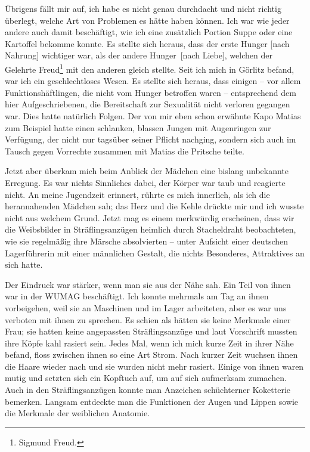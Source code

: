 Übrigens fällt mir auf, ich habe es nicht genau durchdacht und nicht richtig überlegt, welche Art von Problemen es hätte haben können. Ich war wie jeder andere auch damit beschäftigt, wie ich eine zusätzlich Portion Suppe oder eine Kartoffel bekomme konnte. Es stellte sich heraus, dass der erste Hunger [nach Nahrung] wichtiger war, als der andere \glqq Hunger\grqq~[nach Liebe], welchen der Gelehrte Freud\footnote{Sigmund Freud.} mit den anderen gleich stellte. Seit ich mich in Görlitz befand, war ich ein geschlechtloses Wesen. Es stellte sich heraus, dass einigen -- vor allem Funktionshäftlingen, die nicht vom Hunger betroffen waren -- entsprechend dem hier Aufgeschriebenen, die Bereitschaft zur Sexualität nicht verloren gegangen war. Dies hatte natürlich Folgen. Der von mir eben schon erwähnte Kapo Matias zum Beispiel hatte einen schlanken, blassen Jungen mit Augenringen zur Verfügung, der nicht nur tagsüber seiner Pflicht nachging, sondern sich auch im Tausch gegen Vorrechte zusammen mit Matias die Pritsche teilte.

Jetzt aber überkam mich beim Anblick der Mädchen eine bislang unbekannte Erregung. Es war nichts Sinnliches dabei, der Körper war taub und reagierte nicht. An meine Jugendzeit erinnert, rührte es mich innerlich, als ich die herannahenden Mädchen sah; das Herz und die Kehle drückte mir und ich wusste nicht aus welchem Grund. Jetzt mag es einem merkwürdig erscheinen, dass wir die Weibsbilder in Sträflingsanzügen heimlich durch Stacheldraht beobachteten, wie sie regelmäßig ihre Märsche absolvierten -- unter Aufsicht einer deutschen Lagerführerin mit einer männlichen Gestalt, die nichts Besonderes, Attraktives an sich hatte.

Der Eindruck war stärker, wenn man sie aus der Nähe sah. Ein Teil von ihnen war in der WUMAG beschäftigt. Ich konnte mehrmals am Tag an ihnen vorbeigehen, weil sie an Maschinen und im Lager arbeiteten, aber es war uns verboten mit ihnen zu sprechen. Es schien als hätten sie keine Merkmale einer Frau; sie hatten keine angepassten Sträflingsanzüge und laut Vorschrift mussten ihre Köpfe kahl rasiert sein. Jedes Mal, wenn ich mich kurze Zeit in ihrer Nähe befand, floss zwischen ihnen so eine Art Strom. Nach kurzer Zeit wuchsen ihnen die Haare wieder nach und sie wurden nicht mehr rasiert. Einige von ihnen waren mutig und setzten sich ein Kopftuch auf, um auf sich aufmerksam zumachen. Auch in den Sträflingsanzügen konnte man Anzeichen schüchterner Koketterie bemerken. Langsam entdeckte man die Funktionen der Augen und Lippen sowie die Merkmale der weiblichen Anatomie.

